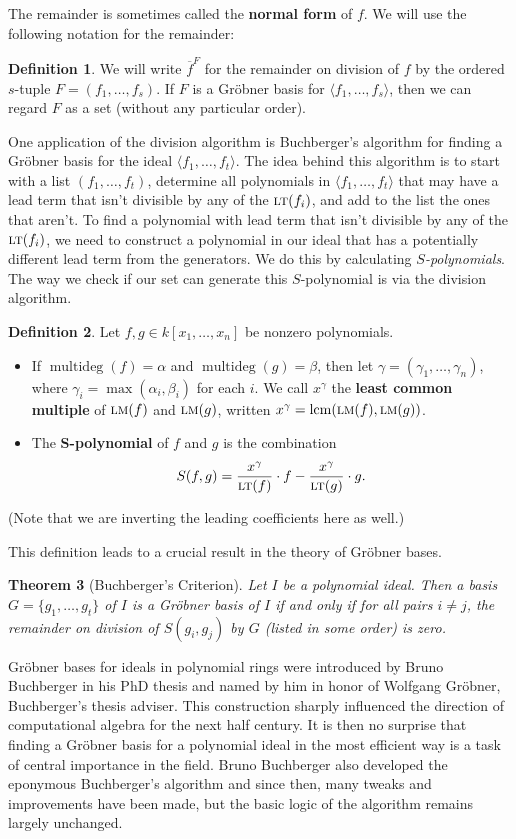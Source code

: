 \documentclass[MS, xcolor=dvipsnames]{wfuthesis}
\DeclareMathOperator{\lcm}{lcm}
\newcommand{\LT}{\ensuremath{\text{\sc lt}}}
\newcommand{\LM}{\ensuremath{\text{\sc lm}}}
\DeclareMathOperator{\multideg}{multideg}
\newtheorem{theorem}{Theorem}
\theoremstyle{definition}
\newtheorem{definition}[theorem]{Definition}
\begin{document}
The remainder is sometimes called the \textbf{normal form} of $f$. We will use the following notation for the remainder:
\begin{definition}
  We will write $\overline f^{F}$ for the remainder on division of $f$ by the ordered $s$-tuple $F = (f_1,\dots,f_s)$. If $F$ is a Gr\"obner basis for $\langle f_1,\dots,f_s \rangle$, then we can regard $F$ as a set  (without any particular order).
\end{definition}
One application of the division algorithm is Buchberger's algorithm for finding a Gr\"obner basis for the ideal $\langle f_1,\dots,f_t \rangle$. The idea behind this algorithm is to start with a list $(f_1,\dots,f_t)$, determine all polynomials in $\langle f_1,\dots,f_t \rangle$ that may have a lead term that isn't divisible by any of the $\LT(f_i)$, and add to the list the ones that aren't. To find a polynomial with lead term that isn't divisible by any of the $\LT(f_i)$, we need to construct a polynomial in our ideal that has a potentially different lead term from the generators. We do this by calculating \emph{$S$-polynomials}. The way we check if our set can generate this $S$-polynomial is via the division algorithm.
\begin{definition}
  Let $f,g \in k[x_1,\dots,x_n]$ be nonzero polynomials.
  \begin{itemize}
    \item If $\multideg(f) = \alpha$ and $\multideg(g) = \beta$, then let $\gamma  =(\gamma_1,\dots,\gamma_n)$, where $\gamma_i = \max(\alpha_i,\beta_i)$ for each $i$. We call $x^\gamma$ the \textbf{least common multiple} of $\LM(f)$ and $\LM(g)$, written $x^\gamma = \lcm(\LM(f),\LM(g))$.
    \item The \textbf{$\mathbf S$-polynomial} of $f$ and $g$ is the combination
    \[ S(f,g) = \frac{x^\gamma}{\LT(f)} \cdot f - \frac{x^\gamma}{\LT(g)} \cdot g. \]
  \end{itemize}
  (Note that we are inverting the leading coefficients here as well.)
\end{definition}
This definition leads to a crucial result in the theory of Gr\"obner bases.
\begin{theorem}[Buchberger's Criterion]
  Let $I$ be a polynomial ideal. Then a basis $G = \{g_1,\dots,g_t\}$ of $I$ is a Gr\"obner basis of $I$ if and only if for all pairs $i \ne j$, the remainder on division of $S(g_i,g_j)$ by $G$ (listed in some order) is zero.
\end{theorem}
Gr\"obner bases for ideals in polynomial rings were introduced by Bruno Buchberger in his PhD thesis \cite{Buchberger1965} and named by him in honor of Wolfgang Gr\"obner, Buchberger's thesis adviser. This construction sharply influenced the direction of computational algebra for the next half century. It is then no surprise that finding a Gr\"obner basis for a polynomial ideal in the most efficient way is a task of central importance in the field. Bruno Buchberger also developed the eponymous Buchberger's algorithm and since then, many tweaks and improvements have been made, but the basic logic of the algorithm remains largely unchanged.
\end{document}
